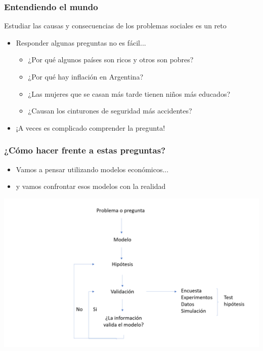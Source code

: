 \documentclass{beamer}
\begin{document}
\begin{frame}
    \frametitle{Entendiendo el mundo}
    Estudiar las causas y consecuencias de los problemas sociales es un reto \vspace{2mm}
    \begin{itemize}
        \item Responder algunas preguntas no es fácil...
        \begin{itemize}
            \item ¿Por qué algunos países son ricos y otros son pobres?
            \item ¿Por qué hay inflación en Argentina?
            \item ¿Las mujeres que se casan más tarde tienen niños más educados?
            \item ¿Causan los cinturones de seguridad más accidentes? \vspace{2mm}
            \end{itemize}
        \item ¡A veces es complicado comprender la pregunta!
    \end{itemize}
\end{frame}

\begin{frame}
\frametitle{¿Cómo hacer frente a estas preguntas?}
    \begin{itemize}
            \item Vamos a pensar utilizando modelos económicos... \vspace{2mm}
            \item y vamos confrontar esos modelos con la realidad
    \end{itemize} \vspace{2mm}
\begin{center}
    \includegraphics[scale=0.35]{Slides Principios de Economia/Figures/modelo.png}
\end{center}
\end{frame}
\end{document}
